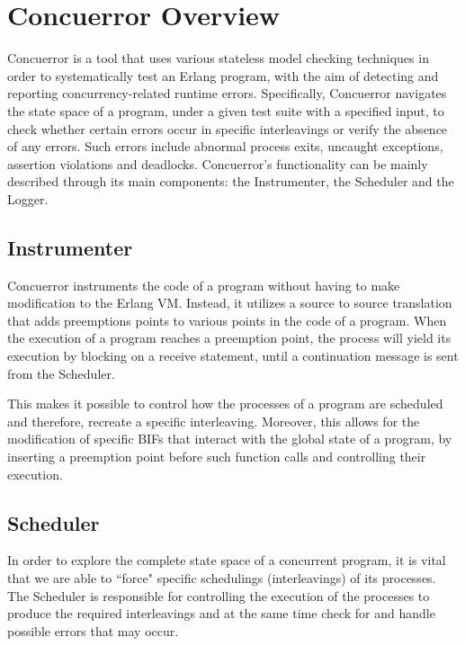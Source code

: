 \section{Concuerror Overview}

Concuerror \cite{6569727, Gotovos:2011:TDC:2034654.2034664} is a tool that uses various stateless model 
checking techniques in order to systematically 
test an Erlang program, with the aim of detecting and reporting concurrency-related runtime errors.
Specifically, Concuerror navigates the state space of a program, under a given test suite with a specified input,
to check whether certain errors occur in specific interleavings or verify the absence of any errors. Such errors include abnormal process exits, uncaught
exceptions, assertion violations and deadlocks. Concuerror's functionality can be mainly described through its main components:
the Instrumenter, the Scheduler and the Logger. 

\subsection{Instrumenter}

Concuerror instruments the code of a program without having to make modification to the Erlang VM. Instead, it
utilizes a source to source translation that adds preemptions points to various points in the code of a program.
When the execution of a program reaches a preemption point, the process will yield its execution by blocking
on a receive statement, until a continuation message is sent from the Scheduler.

This makes it possible to control how the processes of a program are scheduled and therefore, recreate a specific
interleaving. Moreover, this allows for the modification of specific BIFs that interact with the global
state of a program, by inserting a preemption point before such function calls and controlling their execution.

\subsection{Scheduler}

In order to explore the complete state space of a concurrent program, it is vital that we are able to 
``force" specific schedulings (interleavings) of its processes. The Scheduler is responsible for controlling 
the execution of the processes to produce the required interleavings and at the same time
check for and handle possible errors that may occur.

